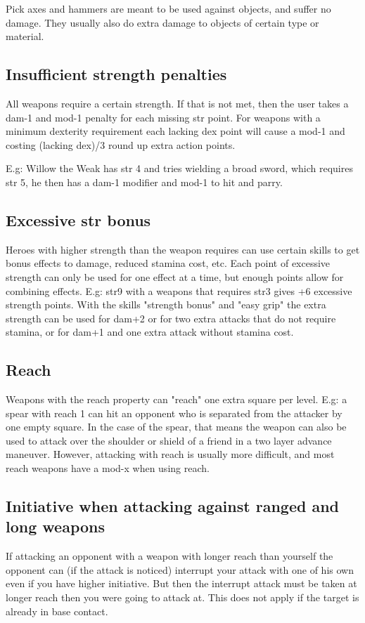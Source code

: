 Pick axes and hammers are meant to be used against objects, and suffer no damage. They usually also do extra damage to objects of certain type or material.


\subsection*{Insufficient strength penalties}
All weapons require a certain strength. If that is not met, then the user takes a dam-1 and mod-1 penalty for each missing str point. For weapons with a minimum dexterity requirement each lacking dex point will cause a mod-1 and costing (lacking dex)/3 round up extra action points.

E.g: Willow the Weak has str 4 and tries wielding a broad sword, which requires str 5, he then has a dam-1 modifier and mod-1 to hit and parry.


\subsection*{Excessive str bonus}
Heroes with higher strength than the weapon requires can use certain skills to get bonus effects to damage, reduced stamina cost, etc. Each point of excessive strength can only be used for one effect at a time, but enough points allow for combining effects. E.g: str9 with a weapons that requires str3 gives +6 excessive strength points. With the skills "strength bonus" and "easy grip" the extra strength can be used for dam+2 or for two extra attacks that do not require stamina, or for dam+1 and one extra attack without stamina cost.


\subsection*{Reach}
Weapons with the reach property can "reach" one extra square per level.
E.g: a spear with reach 1 can hit an opponent who is separated from the attacker by one empty square. In the case of the spear, that means the weapon can also be used to attack over the shoulder or shield of a friend in a two layer advance maneuver. However, attacking with reach is usually more difficult, and most reach weapons have a mod-x when using reach.


\subsection*{Initiative when attacking against ranged and long weapons}
If attacking an opponent with a weapon with longer reach than yourself the opponent can (if the attack is noticed) interrupt your attack with one of his own even if you have higher initiative. But then the interrupt attack must be taken at longer reach then you were going to attack at. This does not apply if the target is already in base contact.

